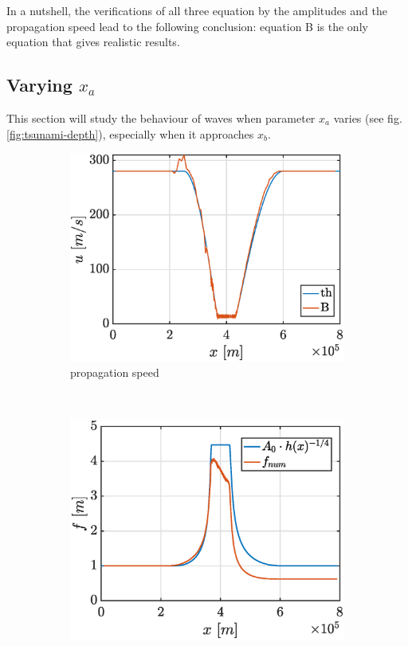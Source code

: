 \documentclass[a4paper,12pt,twoside]{article}
\begin{document}
      In a nutshell, the verifications of all three equation by the amplitudes and the propagation speed lead to the following conclusion: equation B is the only equation that gives realistic results.


      \subsection{Varying $x_a$}
      This section will study the behaviour of waves when parameter $x_a$ varies (see fig. \ref{fig:tsunami-depth}), especially when it approaches $x_b$.


      \begin{figure}[h]
        \centering
        \begin{subfigure}[t]{0.45\textwidth}
          \includegraphics[width=\textwidth]{graphs/xa250000_tfin15000_u.eps}
          \caption{propagation speed}
          \label{fig:xa250000_u}
        \end{subfigure}
        ~
        \begin{subfigure}[t]{0.45\textwidth}
          \includegraphics[width=\textwidth]{graphs/xa250000_tfin15000_f.eps}

\end{subfigure}
\end{figure}
\end{document}
